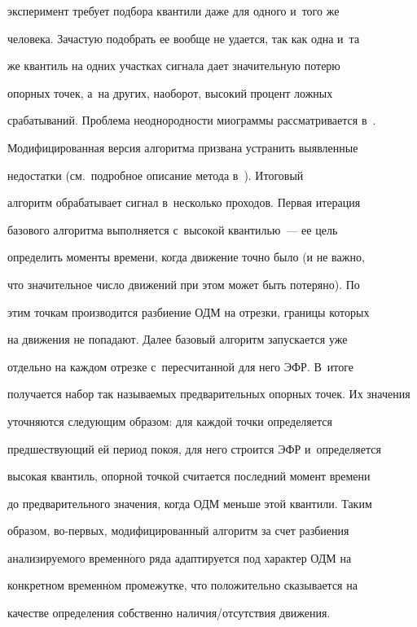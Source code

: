 эксперимент требует подбора квантили даже для одного и~того же


человека. Зачастую подобрать ее вообще не удается, так как одна и~та


же квантиль на одних участках сигнала дает значительную потерю


опорных точек, а~на других, наоборот, высокий процент ложных


срабатываний. Проблема неоднородности миограммы рассматривается в~\cite{bi_7}.





Модифицированная версия алгоритма призвана устранить выявленные


недостатки (см.\ подробное описание метода в~\cite{bi_3}). Итоговый


алгоритм обрабатывает сигнал в~несколько проходов. Первая итерация


базового алгоритма выполняется с~высокой квантилью~--- ее цель


определить моменты времени, когда движение точно было (и не важно,


что значительное число движений при этом может быть потеряно). По


этим точкам производится разбиение ОДМ на отрезки, границы которых


на движения не попадают. Далее базовый алгоритм запускается уже


отдельно на каждом отрезке с~пересчитанной для него ЭФР. В~итоге


получается набор так на\-зы\-ва\-емых предварительных опорных точек. Их значения


уточняются следующим образом: для каждой точки определяется


предшествующий ей период покоя, для него строится ЭФР и~определяется


высокая квантиль, опорной точкой считается последний момент времени


до предварительного значения, когда ОДМ меньше этой квантили. Таким


образом, во-пер\-вых, модифицированный алгоритм за счет разбиения


анализируемого временн$\acute{\mbox{о}}$го ряда адаптируется под характер ОДМ на


конкретном временн$\acute{\mbox{о}}$м промежутке, что положительно сказывается на


качестве определения собственно наличия/отсутствия движения.


